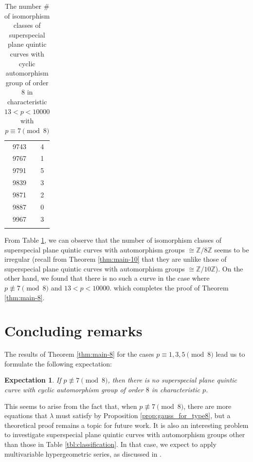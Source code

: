 \documentclass[10pt,a4paper]{amsart}
\newtheorem{Ex}[Def]{Expectation}
\begin{document}
\begin{table}[htbp]
\begin{minipage}{0.135\textwidth}
\begin{tabular}{c|c}
        9743 & 4 \\
        9767 & 1 \\
        9791 & 5 \\
        9839 & 3 \\
        9871 & 2 \\
        9887 & 0 \\
        9967 & 3 \\
             & 
    \end{tabular}
\end{minipage}
\caption{The number $\#$ of isomorphism classes of superspecial plane quintic curves with cyclic automorphism group of order $8$ in characteristic $13 < p < 10000$ with $p \equiv 7 \pmod{8}$}\label{tbl:main}
\end{table}

\newpage 
From Table \ref{tbl:main}, we can observe that the number of isomorphism classes of superspecial plane quintic curves with automorphism groups $\cong \mathbb{Z}/8\mathbb{Z}$ seems to be irregular (recall from Theorem \ref{thm:main-10} that they are unlike those of superspecial plane quintic curves with automorphism groups $\cong \mathbb{Z}/10\mathbb{Z}$).
On the other hand, we found that there is no such a curve in the case where $p \not\equiv 7 \pmod{8}$ and $13 < p < 10000$. which completes the proof of Theorem \ref{thm:main-8}.\vspace{-1mm}

\section{Concluding remarks}\label{sec:concluding}
The results of Theorem \ref{thm:main-8} for the cases $p \equiv 1,3,5 \pmod{8}$ lead us to formulate the following expectation:\vspace{-1mm}
\begin{Ex}
If $p \not\equiv 7 \pmod{8}$, then there is no superspecial plane quintic curve with cyclic automorphism group of order $8$ in characteristic $p$.\vspace{-0.3mm}
\end{Ex}
\noindent This seems to arise from the fact that, when $p \not\equiv 7 \pmod{8}$, there are more equations that $\lambda$ must satisfy by Proposition \ref{prop:gauss_for_type8}, but a theoretical proof remains a topic for future work.
It is also an interesting problem to investigate  superspecial plane quintic curves with automorphism groups other than those in Table \ref{tbl:classification}.
In that case, we expect to apply multivariable hypergeometric series, as discussed in \cite{OH}.
\end{document}
